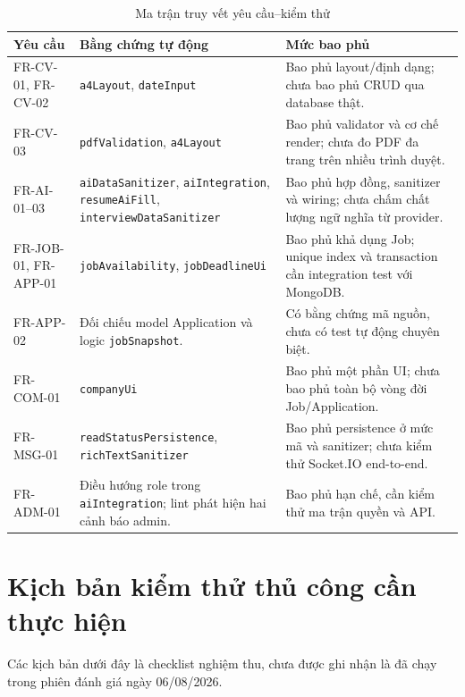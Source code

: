 \begin{table}[H]
    \centering
    \footnotesize
    \begin{tabularx}{\textwidth}{|p{}|p{}|Y|} \hline
        \textbf{Yêu cầu} & \textbf{Bằng chứng tự động} & \textbf{Mức bao phủ} \\ \hline
        FR-CV-01, FR-CV-02 & \texttt{a4Layout}, \texttt{dateInput} & Bao phủ layout/định dạng; chưa bao phủ CRUD qua database thật. \\ \hline
        FR-CV-03 & \texttt{pdfValidation}, \texttt{a4Layout} & Bao phủ validator và cơ chế render; chưa đo PDF đa trang trên nhiều trình duyệt. \\ \hline
        FR-AI-01--03 & \texttt{aiDataSanitizer}, \texttt{aiIntegration}, \texttt{resumeAiFill}, \texttt{interviewDataSanitizer} & Bao phủ hợp đồng, sanitizer và wiring; chưa chấm chất lượng ngữ nghĩa từ provider. \\ \hline
        FR-JOB-01, FR-APP-01 & \texttt{jobAvailability}, \texttt{jobDeadlineUi} & Bao phủ khả dụng Job; unique index và transaction cần integration test với MongoDB. \\ \hline
        FR-APP-02 & Đối chiếu model Application và logic \texttt{jobSnapshot}. & Có bằng chứng mã nguồn, chưa có test tự động chuyên biệt. \\ \hline
        FR-COM-01 & \texttt{companyUi} & Bao phủ một phần UI; chưa bao phủ toàn bộ vòng đời Job/Application. \\ \hline
        FR-MSG-01 & \texttt{readStatusPersistence}, \texttt{richTextSanitizer} & Bao phủ persistence ở mức mã và sanitizer; chưa kiểm thử Socket.IO end-to-end. \\ \hline
        FR-ADM-01 & Điều hướng role trong \texttt{aiIntegration}; lint phát hiện hai cảnh báo admin. & Bao phủ hạn chế, cần kiểm thử ma trận quyền và API. \\ \hline
    \end{tabularx}
    \caption{Ma trận truy vết yêu cầu--kiểm thử}
    \label{tab:requirements-tests}
\end{table}

\section{Kịch bản kiểm thử thủ công cần thực hiện}

Các kịch bản dưới đây là checklist nghiệm thu, chưa được ghi nhận là đã chạy trong phiên đánh giá ngày 06/08/2026.

